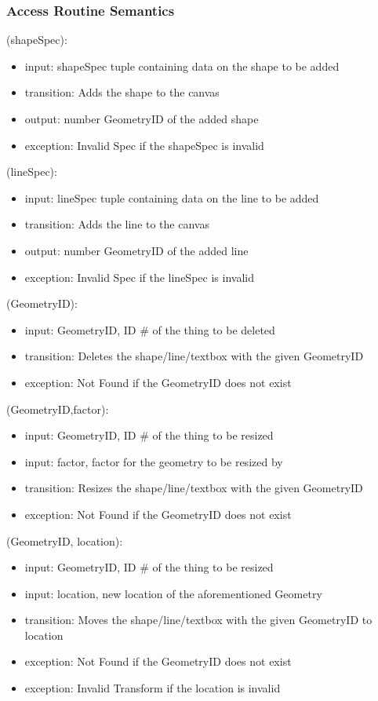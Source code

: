 \documentclass[12pt, titlepage]{article}
\begin{document}
\subsubsection{Access Routine Semantics}

(shapeSpec):
\begin{itemize}
\item input: shapeSpec tuple containing data on the shape to be added
\item transition: Adds the shape to the canvas
\item output: number GeometryID of the added shape
\item exception: Invalid Spec if the shapeSpec is invalid
\end{itemize}

(lineSpec):
\begin{itemize}
\item input: lineSpec tuple containing data on the line to be added
\item transition: Adds the line to the canvas
\item output: number GeometryID of the added line
\item exception: Invalid Spec if the lineSpec is invalid
\end{itemize}

(GeometryID):
\begin{itemize}
\item input: GeometryID, ID \# of the thing to be deleted
\item transition: Deletes the shape/line/textbox with the given GeometryID
\item exception: Not Found if the GeometryID does not exist
\end{itemize}

(GeometryID,factor):
\begin{itemize}
\item input: GeometryID, ID \# of the thing to be resized
\item input: factor, factor for the geometry to be resized by
\item transition: Resizes the shape/line/textbox with the given GeometryID
\item exception: Not Found if the GeometryID does not exist
\end{itemize}

(GeometryID, location):
\begin{itemize}
\item input: GeometryID, ID \# of the thing to be resized
\item input: location, new location of the aforementioned Geometry
\item transition: Moves the shape/line/textbox with the given GeometryID to location
\item exception: Not Found if the GeometryID does not exist
\item exception: Invalid Transform if the location is invalid
\end{itemize}
\end{document}
